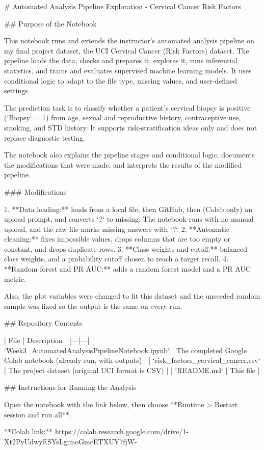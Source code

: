 # Automated Analysis Pipeline Exploration - Cervical Cancer Risk Factors

## Purpose of the Notebook

This notebook runs and extends the instructor's automated analysis pipeline on my final
project dataset, the UCI Cervical Cancer (Risk Factors) dataset. The pipeline loads the
data, checks and prepares it, explores it, runs inferential statistics, and trains and
evaluates supervised machine learning models. It uses conditional logic to adapt to the
file type, missing values, and user-defined settings.

The prediction task is to classify whether a patient's cervical biopsy is positive
(`Biopsy` = 1) from age, sexual and reproductive history, contraceptive use, smoking, and
STD history. It supports risk-stratification ideas only and does not replace diagnostic
testing.

The notebook also explains the pipeline stages and conditional logic, documents the
modifications that were made, and interprets the results of the modified pipeline.

### Modifications

1. **Data loading:** loads from a local file, then GitHub, then (Colab only) an upload prompt, and converts `?` to missing. The notebook runs with no manual upload, and the raw file marks missing answers with `?`.
2. **Automatic cleaning:** fixes impossible values, drops columns that are too empty or constant, and drops duplicate rows. 
3. **Class weights and cutoff:** balanced class weights, and a probability cutoff chosen to reach a target recall.
4. **Random forest and PR AUC:** adds a random forest model and a PR AUC metric. 

Also, the plot variables were changed to fit this dataset and the unseeded random sample was fixed so the output is the same on every run.

## Repository Contents

| File | Description |
|---|---|
| `Week3_AutomatedAnalysisPipelineNotebook.ipynb` | The completed Google Colab notebook (already run, with outputs) |
| `risk_factors_cervical_cancer.csv` | The project dataset (original UCI format is CSV) |
| `README.md` | This file |

## Instructions for Running the Analysis

Open the notebook with the link below, then choose **Runtime > Restart session and run all**.

**Colab link:** https://colab.research.google.com/drive/1-Xt2PyUdwyESYsLgimoGmcETXUY7fjW- 

